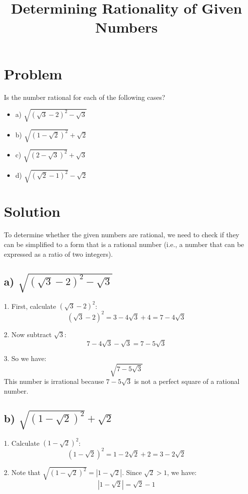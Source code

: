 \documentclass{article}
\title{Determining Rationality of Given Numbers}
\author{}
\date{}
\begin{document}
\maketitle

\section*{Problem}
Is the number rational for each of the following cases?

\begin{itemize}
    \item a) \( \sqrt{(\sqrt{3} - 2)^2 - \sqrt{3}} \)
    \item b) \( \sqrt{(1 - \sqrt{2})^2} + \sqrt{2} \)
    \item c) \( \sqrt{(2 - \sqrt{3})^2} + \sqrt{3} \)
    \item d) \( \sqrt{(\sqrt{2} - 1)^2} - \sqrt{2} \)
\end{itemize}

\section*{Solution}
To determine whether the given numbers are rational, we need to check if they can be simplified to a form that is a rational number (i.e., a number that can be expressed as a ratio of two integers).

\subsection*{a) \( \sqrt{(\sqrt{3} - 2)^2 - \sqrt{3}} \)}

1. First, calculate \( (\sqrt{3} - 2)^2 \):
   \[
   (\sqrt{3} - 2)^2 = 3 - 4\sqrt{3} + 4 = 7 - 4\sqrt{3}
   \]

2. Now subtract \( \sqrt{3} \):
   \[
   7 - 4\sqrt{3} - \sqrt{3} = 7 - 5\sqrt{3}
   \]

3. So we have:
   \[
   \sqrt{7 - 5\sqrt{3}}
   \]
   This number is irrational because \( 7 - 5\sqrt{3} \) is not a perfect square of a rational number.

\subsection*{b) \( \sqrt{(1 - \sqrt{2})^2} + \sqrt{2} \)}

1. Calculate \( (1 - \sqrt{2})^2 \):
   \[
   (1 - \sqrt{2})^2 = 1 - 2\sqrt{2} + 2 = 3 - 2\sqrt{2}
   \]

2. Note that \( \sqrt{(1 - \sqrt{2})^2} = |1 - \sqrt{2}| \). Since \( \sqrt{2} > 1 \), we have:
   \[
   |1 - \sqrt{2}| = \sqrt{2} - 1
   \]
\end{document}
